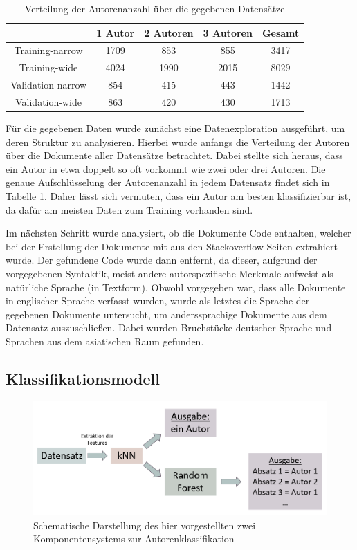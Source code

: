 \documentclass[conference]{IEEEtran}
\begin{document}
		\begin{table}[htbp]
			\caption{Verteilung der Autorenanzahl über die gegebenen Datensätze}
			\begin{center}
				\begin{tabular}{|c|c|c|c|c|}
					\hline
					 & 1 Autor & 2 Autoren & 3 Autoren & Gesamt \\
					\hline
					Training-narrow & 1709 & 853 & 855 & 3417 \\
					\hline 
					Training-wide & 4024 & 1990 & 2015 & 8029 \\
					\hline
					Validation-narrow & 854 & 415 & 443 & 1442\\
					\hline 
					Validation-wide & 863 & 420 & 430 & 1713\\
					\hline
				\end{tabular}
				\label{tab:ds_1}
			\end{center}
		\end{table}
	
		
		Für die gegebenen Daten wurde zunächst eine Datenexploration ausgeführt, um deren Struktur zu analysieren. Hierbei wurde anfangs die Verteilung der Autoren über die Dokumente aller Datensätze betrachtet. Dabei stellte sich heraus, dass ein Autor in etwa doppelt so oft vorkommt wie zwei oder drei Autoren. Die genaue Aufschlüsselung der Autorenanzahl in jedem Datensatz findet sich in Tabelle \ref{tab:ds_1}. Daher lässt sich vermuten, dass ein Autor am besten klassifizierbar ist, da dafür am meisten Daten zum Training vorhanden sind.
		
		Im nächsten Schritt wurde analysiert, ob die Dokumente Code enthalten, welcher bei der Erstellung der Dokumente mit aus den Stackoverflow Seiten extrahiert wurde. Der gefundene Code wurde dann entfernt, da dieser, aufgrund der vorgegebenen Syntaktik, meist andere autorspezifische Merkmale aufweist als natürliche Sprache (in Textform).
		Obwohl vorgegeben war, dass alle Dokumente in englischer Sprache verfasst wurden, wurde als letztes die Sprache der gegebenen Dokumente untersucht, um anderssprachige Dokumente aus dem Datensatz auszuschließen. Dabei wurden Bruchstücke deutscher Sprache und Sprachen aus dem asiatischen Raum gefunden.
		
\subsection{Klassifikationsmodell}
	
	\begin{figure}[h]
		\centering
		\includegraphics[width=0.8\linewidth]{alg}
		\caption{Schematische Darstellung des hier vorgestellten zwei Komponentensystems zur Autorenklassifikation}
		\label{fig:algorithm}
	\end{figure}
	
\end{document}
